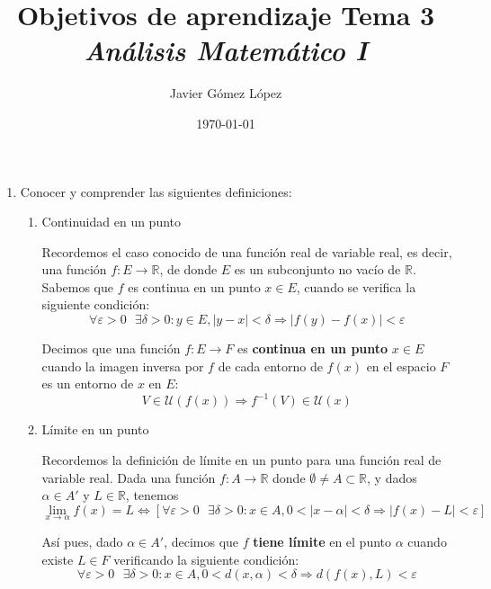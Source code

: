 \documentclass[a4paper, 12pt]{article}
\title{\textbf{Objetivos de aprendizaje Tema 3} \\ \textit{Análisis Matemático I}}
\author{Javier Gómez López}
\date{\today}
\begin{document}
\maketitle

\begin{enumerate}[label=\textbf{\arabic*}.]

\item Conocer y comprender las siguientes definiciones:
	\begin{enumerate}[label=\textit{\alph*})]
	
	\item Continuidad en un punto

Recordemos el caso conocido de una función real de variable real, es decir, una función \(f : E \rightarrow \mathbb{R}\), de donde \(E\) es un subconjunto no vacío de \(\mathbb{R}\). Sabemos que \(f\) es continua en un punto \(x \in E\), cuando se verifica la siguiente condición:
\begin{equation}\label{distancia_r}
	\forall \varepsilon > 0 \text{ } \exists \delta > 0 : y \in E, |y-x| < \delta \Rightarrow |f(y) - f(x)| < \varepsilon
\end{equation}

Decimos que una función \(f: E \rightarrow F\) es \textbf{continua en un punto} \(x \in E\) cuando la imagen inversa por \(f\) de cada entorno de \(f(x)\) en el espacio \(F\) es un entorno de \(x\) en \(E\):
\[
	V \in \mathcal{U}(f(x)) \Longrightarrow f^{-1}(V) \in \mathcal{U}(x)
\]

\bigskip

	\item Límite en un punto
	
Recordemos la definición de límite en un punto para una función real de variable real. Dada una función \(f: A \rightarrow \mathbb{R}\) donde \(\emptyset \neq A \subset \mathbb{R}\), y dados \(\alpha \in A'\) y \(L \in \mathbb{R}\), tenemos
\[
	\lim_{x \to \alpha} f(x) = L \Longleftrightarrow \left[ \forall \varepsilon >0 \text{ } \exists \delta > 0 : x \in A, 0 < |x - \alpha| < \delta \Rightarrow |f(x) - L| < \varepsilon \right]
\]

Así pues, dado \(\alpha \in A'\), decimos que \(f\) \textbf{tiene límite} en el punto \(\alpha\) cuando existe \(L \in F\) verificando la siguiente condición:
\begin{equation}\label{lim_general}
	\forall \varepsilon > 0 \text{ } \exists \delta > 0 : x \in A, 0 < d(x, \alpha) < \delta \Rightarrow d(f(x), L) < \varepsilon
\end{equation}


\end{enumerate}
\end{enumerate}
\end{document}
